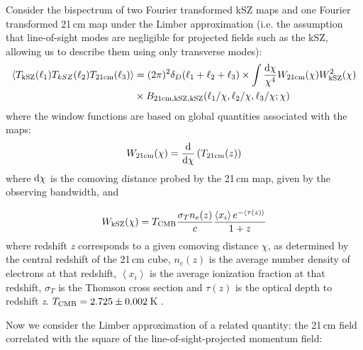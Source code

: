 Consider the bispectrum of two Fourier transformed kSZ maps and one Fourier transformed 21\,cm map under the Limber approximation (i.e. the assumption that line-of-sight modes are negligible for projected fields such as the kSZ, allowing us to describe them using only transverse modes):
\begin{equation}
\begin{split}
 \left\langle T_{\rm kSZ}(\ell_1) T_{kSZ}(\ell_2) T_{\rm 21cm}(\ell_3)\right\rangle &= 
(2\pi)^2 \delta_D(\ell_1 + \ell_2 + \ell_3) \times \int
 \frac{{\rm d}\chi}{\chi^4} W_{\rm 21cm}(\chi) W_{\rm kSZ}^2(\chi)  \\
 & \times B_{\rm 21cm, kSZ, kSZ}(\ell_1/\chi, \ell_2/\chi,  \ell_3/\chi; \chi)
\label{eq:bispec_limber}
\end{split}
\end{equation}
where the window functions are based on global quantities associated with the maps:
\begin{equation}
W_{\rm 21cm}(\chi) = {\rm \frac{d}{d\chi}}\left(T_{\rm 21cm}(z)\right)
\label{eq:W21cm}
\end{equation}
where ${\rm d\chi}$ is the comoving distance probed by the 21\,cm map, given by the observing bandwidth, and

\begin{equation}
W_{\rm kSZ}(\chi) = T_{\rm CMB} \frac{\sigma_T n_e(z)}{c}\frac{\left\langle x_i \right\rangle e^{-\left\langle \tau(z) \right\rangle } }{1+z}
\label{eq:WkSZ}
\end{equation}
where redshift \textit{z} corresponds to a given comoving distance $\chi$, as determined by the central redshift of the 21\,cm cube, $n_e(z)$ is the average number density of electrons at that redshift, $\left\langle x_i \right\rangle $ is the average ionization fraction at that redshift, $\sigma_T$ is the Thomson cross section and $\tau (z)$ is the optical depth to redshift \textit{z}. $T_{\rm CMB} = 2.725\pm0.002$\,K \citep{Mather.99, Fixsen.04}.

Now we consider the Limber approximation of a related quantity: the 21\,cm field correlated with the square of the line-of-sight-projected momentum field:

